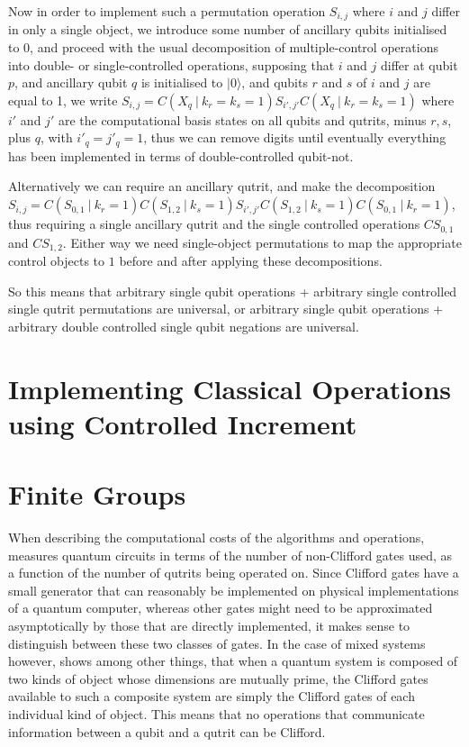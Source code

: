\documentclass[]{article}
\newcommand{\ket}[1]{| #1 \rangle}
\begin{document}
Now in order to implement such a permutation operation $S_{i,j}$ where $i$ and $j$ differ in only a single object, we introduce some number of ancillary qubits initialised to 0, and proceed with the usual decomposition of multiple-control operations into double- or single-controlled operations, supposing that $i$ and $j$ differ at qubit $p$, and ancillary qubit $q$ is initialised to $\ket{0}$, and qubits $r$ and $s$ of $i$ and $j$ are equal to 1, we write $S_{i,j} = C(X_q\ |\ k_r=k_s=1)S_{i',j'}C(X_q\ |\ k_r=k_s=1)$ where $i'$ and $j'$ are the computational basis states on all qubits and qutrits, minus $r, s$, plus $q$, with $i'_q=j'_q=1$, thus we can remove digits until eventually everything has been implemented in terms of double-controlled qubit-not.

Alternatively we can require an ancillary qutrit, and make the decomposition $S_{i,j} = C(S_{0,1}\ |\ k_r=1)C(S_{1,2}\ |\ k_s=1)S_{i',j'}C(S_{1,2}\ |\ k_s=1)C(S_{0,1}\ |\ k_r=1)$, thus requiring a single ancillary qutrit and the single controlled operations $CS_{0,1}$ and $CS_{1,2}$. Either way we need single-object permutations to map the appropriate control objects to $1$ before and after applying these decompositions.

So this means that arbitrary single qubit operations + arbitrary single controlled single qutrit permutations are universal, or arbitrary single qubit operations + arbitrary double controlled single qubit negations are universal.

\section{Implementing Classical Operations using Controlled Increment}

\section{Finite Groups}
When describing the computational costs of the algorithms and operations, \cite{arithmetics} measures quantum circuits in terms of the number of non-Clifford gates used, as a function of the number of qutrits being operated on. Since Clifford gates have a small generator that can reasonably be implemented on physical implementations of a quantum computer, whereas other gates might need to be approximated asymptotically by those that are directly implemented, it makes sense to distinguish between these two classes of gates. In the case of mixed systems however, \cite{tolar-clifford} shows among other things, that when a quantum system is composed of two kinds of object whose dimensions are mutually prime, the Clifford gates available to such a composite system are simply the Clifford gates of each individual kind of object. This means that no operations that communicate information between a qubit and a qutrit can be Clifford.
\end{document}

